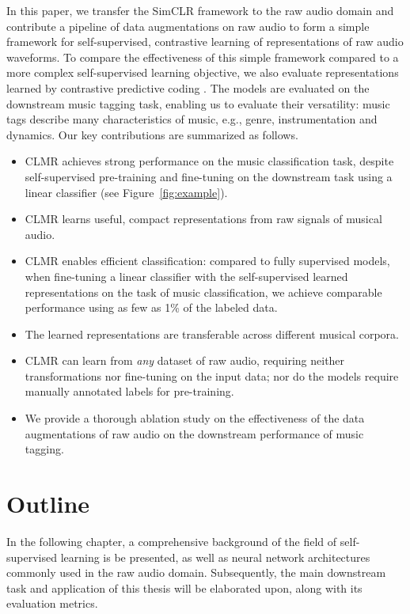 In this paper, we transfer the SimCLR framework \cite{chen_simple_2020} to the raw audio domain and contribute a pipeline of data augmentations on raw audio to form a simple framework for self-supervised, contrastive  learning of representations of raw audio waveforms.
To compare the effectiveness of this simple framework compared to a more complex self-supervised learning objective, we also evaluate representations learned by contrastive predictive coding \cite{oord_representation_2019}.
The models are evaluated on the downstream music tagging task, enabling us to evaluate their versatility: music tags describe many characteristics of music, e.g., genre, instrumentation and dynamics.
Our key contributions are summarized as follows.
\begin{itemize}
    \item CLMR achieves strong performance on the music classification task, despite self-supervised pre-training and fine-tuning on the downstream task using a linear classifier (see Figure~\ref{fig:example}).
    \item CLMR learns useful, compact representations from raw signals of musical audio.
    \item CLMR enables efficient classification: compared to fully supervised models, when fine-tuning a linear classifier with the self-supervised learned representations on the task of music classification, we achieve comparable performance using as few as 1\% of the labeled data.
    \item The learned representations are transferable across different musical corpora.
    \item CLMR can learn from \emph{any} dataset of raw audio, requiring neither transformations nor fine-tuning on the input data; nor do the models require manually annotated labels for pre-training.
    \item We provide a thorough ablation study on the effectiveness of the data augmentations of raw audio on the downstream performance of music tagging.
\end{itemize}


\section{Outline}
In the following chapter, a comprehensive background of the field of self-supervised learning is be presented, as well as neural network architectures commonly used in the raw audio domain.
Subsequently, the main downstream task and application of this thesis will be elaborated upon, along with its evaluation metrics.

